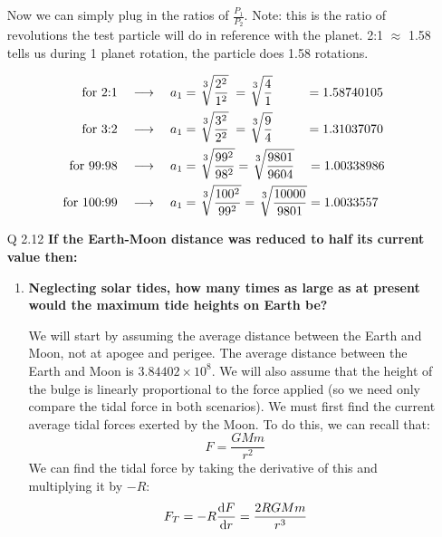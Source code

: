 \documentclass[10pt]{article}
\begin{document}
\begin{enumerate}
		Now we can simply plug in the ratios of $\displaystyle \frac{P_1}{P_2}$. Note: this is the ratio of revolutions the test particle will do in reference with the planet. 2:1 $\approx$ 1.58 tells us during 1 planet rotation, the particle does 1.58 rotations.
		
		\begin{align*}
			\text{for 2:1} \quad \longrightarrow \quad a_1 &= \sqrt[\uproot{3}\scriptstyle 3]{\frac{2^2}{1^2}} \; = \sqrt[\uproot{3}\scriptstyle 3]{\frac{4}{1}} \hspace{26px} = 1.58740105 \\ 
			\text{for 3:2} \quad \longrightarrow \quad a_1 &= \sqrt[\uproot{3}\scriptstyle 3]{\frac{3^2}{2^2}} \; = \sqrt[\uproot{3}\scriptstyle 3]{\frac{9}{4}} \hspace{26px} = 1.31037070 \\ 
			\text{for 99:98} \quad \longrightarrow \quad a_1 &= \sqrt[\uproot{3}\scriptstyle 3]{\frac{99^2}{98^2}} = \sqrt[\uproot{3}\scriptstyle 3]{\frac{9801}{9604}} \hspace{10px} = 1.00338986 \\ 
			\text{for 100:99} \quad \longrightarrow \quad a_1 &= \sqrt[\uproot{3}\scriptstyle 3]{\frac{100^2}{99^2}} = \sqrt[\uproot{3}\scriptstyle 3]{\frac{10000}{9801}} = 1.0033557\\ 
		\end{align*}
		
		
		
		\newpage
		\item [Q 2.12] \textbf{If the Earth-Moon distance was reduced to half its current value then: }
		\begin{enumerate}
			\item \textbf{Neglecting solar tides, how many times as large as at present would the maximum tide heights on Earth be?}
			
			We will start by assuming the average distance between the Earth and Moon, not at apogee and perigee. The average distance between the Earth and Moon is $3.84402\times 10^8$. We will also assume that the height of the bulge is linearly proportional to the force applied (so we need only compare the tidal force in both scenarios). We must first find the current average tidal forces exerted by the Moon. To do this, we can recall that:
			\[ F = \frac{GMm}{r^2} \]
			We can find the tidal force by taking the derivative of this and multiplying it by $-R$:
			\[ F_T = -R \dv{F}{r} = \frac{2RGMm}{r^3} \]
			

\end{enumerate}
\end{enumerate}
\end{document}
